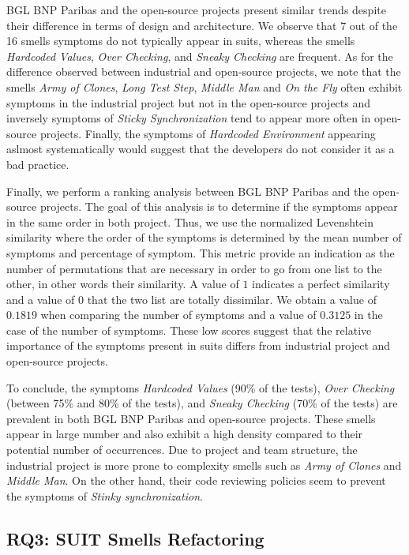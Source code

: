 BGL BNP Paribas and the open-source projects present similar trends despite their difference in terms of design and architecture. We observe that 7 out of the 16 smells symptoms do not typically appear in \gls{suit}s, whereas the smells \emph{Hardcoded Values}, \emph{Over Checking}, and \emph{Sneaky Checking} are frequent. As for the difference observed between industrial and open-source projects, we note that the smells \emph{Army of Clones}, \emph{Long Test Step}, \emph{Middle Man} and \emph{On the Fly} often exhibit symptoms in the industrial project but not in the open-source projects and inversely symptoms of \emph{Sticky Synchronization} tend to appear more often in open-source projects. Finally, the symptoms of \emph{Hardcoded Environment} appearing aslmost systematically would suggest that the developers do not consider it as a bad practice.

Finally, we perform a ranking analysis between BGL BNP Paribas and the open-source projects. The goal of this analysis is to determine if the symptoms appear in the same order in both project. Thus, we use the normalized Levenshtein similarity where the order of the symptoms is determined by the mean number of symptoms and percentage of symptom. This metric provide an indication as the number of permutations that are necessary in order to go from one list to the other, in other words their similarity. A value of $1$ indicates a perfect similarity and a value of $0$ that the two list are totally dissimilar. We obtain a value of $0.1819$ when comparing the number of symptoms and a value of $0.3125$ in the case of the number of symptoms. These low scores suggest that the relative importance of the symptoms present in \gls{suit}s differs from industrial project and open-source projects.


To conclude, the symptoms \emph{Hardcoded Values} (90\% of the tests), \emph{Over Checking} (between 75\% and 80\% of the tests), and \emph{Sneaky Checking} (70\% of the tests) are prevalent in both BGL BNP Paribas and open-source projects. These smells appear in large number and also exhibit a high density compared to their potential number of occurrences. Due to project and team structure, the industrial project is more prone to complexity smells such as \emph{Army of Clones} and \emph{Middle Man}. On the other hand, their code reviewing policies seem to prevent the symptoms of \emph{Stinky synchronization}.

\subsection{RQ3: SUIT Smells Refactoring}
\label{sec:results-smell-refactoring}

